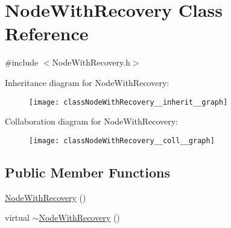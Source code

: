 \hypertarget{classNodeWithRecovery}{}\section{Node\+With\+Recovery Class Reference}
\label{classNodeWithRecovery}


{\ttfamily \#include $<$Node\+With\+Recovery.\+h$>$}



Inheritance diagram for Node\+With\+Recovery\+:\nopagebreak
\begin{figure}[H]
\begin{center}
\leavevmode
\texttt{[image: classNodeWithRecovery\_\_inherit\_\_graph]}
\end{center}
\end{figure}


Collaboration diagram for Node\+With\+Recovery\+:\nopagebreak
\begin{figure}[H]
\begin{center}
\leavevmode
\texttt{[image: classNodeWithRecovery\_\_coll\_\_graph]}
\end{center}
\end{figure}
\subsection*{Public Member Functions}
\begin{DoxyCompactItemize}
\item 
\hyperlink{classNodeWithRecovery_aed1d9b2cfa7729902c90c103ab3075ff}{Node\+With\+Recovery} ()
\item 
virtual \hyperlink{classNodeWithRecovery_a5cb1367a800cf960b96c9011ab94a616}{$\sim$\+Node\+With\+Recovery} ()
\end{DoxyCompactItemize}
